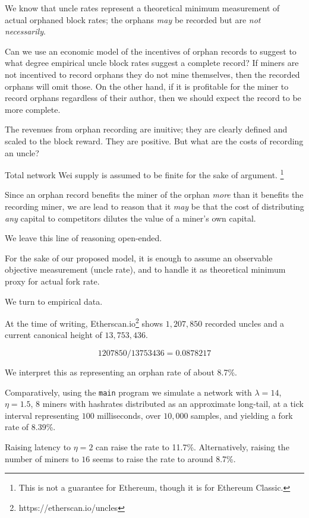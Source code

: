 \documentclass[11pt]{article}
\theoremstyle{plain}
\begin{document}
We know that uncle rates represent a theoretical minimum measurement of actual
orphaned block rates; the orphans \emph{may} be recorded but are \emph{not
necessarily}.

Can we use an economic model of the incentives of orphan records to suggest to
what degree empirical uncle block rates suggest a complete record?
If miners are not incentived to record orphans they do not mine themselves,
then the recorded orphans will omit those. On the other hand, if it is
profitable for the miner to record orphans regardless of their author, then we
should expect the record to be more complete.

The revenues from orphan recording are inuitive; they are clearly defined and
scaled to the block reward. They are positive. But what are the costs of
recording an uncle?

Total network Wei supply is assumed to be finite for the sake of
argument.\nolinebreak
\footnote{This is not a guarantee for Ethereum, though it is for Ethereum Classic.}

Since an orphan record benefits the miner of the orphan \emph{more} than it
benefits the recording miner, we are lead to reason that it \emph{may} be that the
cost of distributing \emph{any} capital to competitors dilutes the value of a
miner's own capital.

We leave this line of reasoning open-ended.

For the sake of our proposed model, it is enough to assume an observable
objective measurement (uncle rate), and to handle it as theoretical minimum
proxy for actual fork rate.

We turn to empirical data.

At the time of writing, Etherscan.io\footnote{https://etherscan.io/uncles}
shows $1,207,850$ recorded uncles and a current canonical height of $13,753,436$. 

\begin{equation}
  1207850 / 13753436 = 0.0878217
\end{equation}

We interpret this as representing an orphan rate of about 8.7\%. 

Comparatively, using the \texttt{main} program we simulate a network with
$\lambda=14$, $\eta=1.5$, $8$ miners with hashrates distributed as an
approximate long-tail, at a tick interval representing $100$ milliseconds, over
$10,000$ samples, and yielding a fork rate of 8.39\%. 

Raising latency to $\eta=2$ can raise the rate to 11.7\%.
Alternatively, raising the number of miners to $16$ seems to raise the rate to
around 8.7\%.
\end{document}
